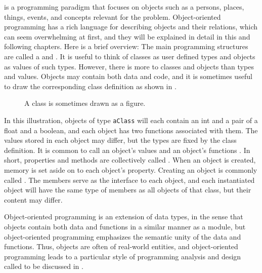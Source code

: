 \documentclass[fsharpNotes.tex]{subfiles}
\begin{document}
 is a programming paradigm that focuses on objects such as a persons, places, things, events, and concepts relevant for the problem. Object-oriented programming has a rich language for describing objects and their relations, which can seem overwhelming at first, and they will be explained in detail in this and following chapters. Here is a brief overview: The main programming structures are called a  and . It is useful to think of classes as user defined types and objects as values of such types. However, there is more to classes and objects than types and values. Objects may contain both data and code, and it is sometimes useful to draw the corresponding class definition as shown in .
\begin{figure}
  \centering
  \caption{A class is sometimes drawn as a figure.}
  \label{fig:aClass}
\end{figure}
In this illustration, objects of type \lstinline{aClass} will each contain an int and a pair of a float and a boolean, and each object has two functions associated with them. The values stored in each object may differ, but the types are fixed by the class definition. It is common to call an object's values  and an object's functions . In short, properties and methods are collectively called . When an object is created, memory is set aside on  to each object's property. Creating an object is commonly called . The members serve as the interface to each object, and each instantiated object will have the same type of members as all objects of that class, but their content may differ.

Object-oriented programming is an extension of data types, in the sense that objects contain both data and functions in a similar manner as a module, but object-oriented programming emphasizes the semantic unity of the data and functions. Thus, objects are often  of real-world entities, and object-oriented programming leads to a particular style of programming analysis and design called  to be discussed in . 
\end{document}

